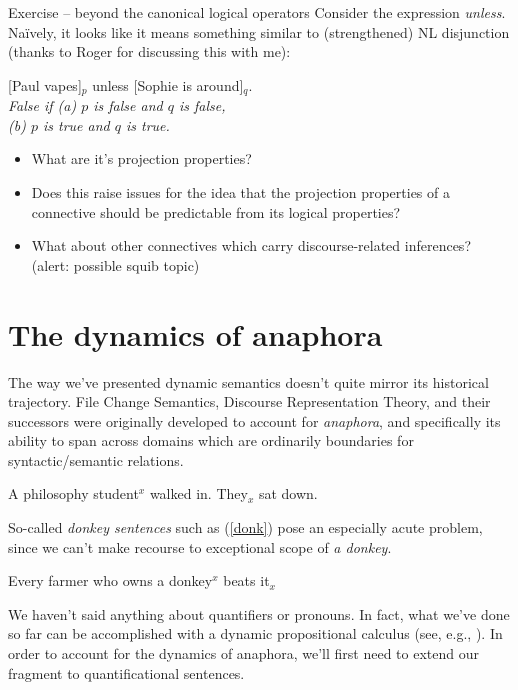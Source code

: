 \documentclass[cronos,landscape,paper=letter]{ling-handout}
\begin{document}
  \begin{tcolorbox}
    Exercise -- beyond the canonical logical operators
    \tcblower
    Consider the expression \textit{unless}. Naïvely, it looks like it means something similar to (strengthened) NL disjunction (thanks to Roger for discussing this with me):

    \ex
    {}[Paul vapes]\(_{p}\) unless [Sophie is around]\(_{q}\).\\
    \textit{False if (a) \(p\) is false and \(q\) is false,\\
      (b) \(p\) is true and \(q\) is true.}
    \xe
    \vspace{1ex}
    \begin{itemize}
    \item What are it's projection properties?
    \item Does this raise issues for the idea that the projection properties of a connective should be predictable from its logical properties?
    \item What about other connectives which carry discourse-related inferences? (alert: possible squib topic)
    \end{itemize}
  \end{tcolorbox}

  \section{The dynamics of anaphora}

  The way we've presented dynamic semantics doesn't quite mirror its historical trajectory. File Change Semantics, Discourse Representation Theory, and their successors were originally developed to account for \textit{anaphora}, and specifically its ability to span across domains which are ordinarily boundaries for syntactic/semantic relations.

  \ex
  A philosophy student\(^{x}\) walked in. They\(_{x}\) sat down.
  \xe

  So-called \textit{donkey sentences} such as (\ref{donk}) pose an especially acute problem, since we can't make recourse to exceptional scope of \textit{a donkey}.

  \ex\label{donk}
  Every farmer who owns a donkey\(^{x}\) beats it\(_{x}\)
  \xe

  We haven't said anything about quantifiers or pronouns. In fact, what we've done so far can be accomplished with a dynamic propositional calculus (see, e.g., \citealt{varieties_1984}). In order to account for the dynamics of anaphora, we'll first need to extend our fragment to quantificational sentences.
\end{document}
